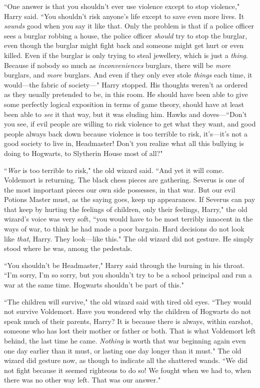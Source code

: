 ``One answer is that you shouldn't ever use violence except to stop violence," Harry said. ``You shouldn't risk anyone's life except to save even more lives. It \emph{sounds} good when you say it like that. Only the problem is that if a police officer sees a burglar robbing a house, the police officer \emph{should} try to stop the burglar, even though the burglar might fight back and someone might get hurt or even killed. Even if the burglar is only trying to steal jewellery, which is just a \emph{thing}. Because if nobody so much as \emph{inconveniences} burglars, there will be \emph{more} burglars, and \emph{more} burglars. And even if they only ever stole \emph{things} each time, it would---the fabric of society---" Harry stopped. His thoughts weren't as ordered as they usually pretended to be, in this room. He should have been able to give some perfectly logical exposition in terms of game theory, should have at least been able to \emph{see} it that way, but it was eluding him. Hawks and doves---``Don't you see, if evil people are willing to risk violence to get what they want, and good people always back down because violence is too terrible to risk, it's---it's not a good society to live in, Headmaster! Don't you realize what all this bullying is doing to Hogwarts, to Slytherin House most of all?"

``\emph{War} is too terrible to risk," the old wizard said. ``And yet it will come. Voldemort is returning. The black chess pieces are gathering. Severus is one of the most important pieces our own side possesses, in that war. But our evil Potions Master must, as the saying goes, keep up appearances. If Severus can pay that keep by hurting the feelings of children, only their feelings, Harry," the old wizard's voice was very soft, ``you would have to be most terribly innocent in the ways of war, to think he had made a poor bargain. Hard decisions do not look like \emph{that}, Harry. They look---like this." The old wizard did not gesture. He simply stood where he was, among the pedestals.

``You shouldn't be Headmaster," Harry said through the burning in his throat. ``I'm sorry, I'm so sorry, but you shouldn't try to be a school principal and run a war at the same time. Hogwarts shouldn't be part of this."

``The children will survive," the old wizard said with tired old eyes. ``They would not survive Voldemort. Have you wondered why the children of Hogwarts do not speak much of their parents, Harry? It is because there is always, within earshot, someone who has lost their mother or father or both. That is what Voldemort left behind, the last time he came. \emph{Nothing} is worth that war beginning again even one day earlier than it must, or lasting one day longer than it must." The old wizard did gesture now, as though to indicate all the shattered wands. ``We did not fight because it seemed righteous to do so! We fought when we had to, when there was no other way left. That was our answer."


